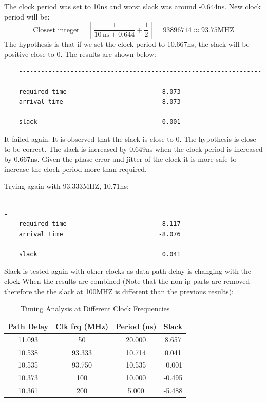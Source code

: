 \documentclass{report}
\begin{document}
The clock period was set to 10ns and worst slack was around -0.644ns. New clock period will be:
\[
\text{Closest integer} = \left\lfloor \frac{1}{10 \, \text{ns} + 0.644} + \frac{1}{2} \right\rfloor = 93896714 \approx 93.75 \text{MHZ}
\]
The hypothesis is that if we set the clock period to 10.667ns, the slack will be positive close to 0. The results are shown below:
\begin{verbatim}
    -------------------------------------------------------------------
    required time                          8.073    
    arrival time                          -8.073    
-------------------------------------------------------------------
    slack                                 -0.001
\end{verbatim}
It failed again. It is observed that the slack is close to 0. The hypothesis is close to be correct. The slack is increased by 0.649ns when the clock period is increased by 0.667ns. Given the phase error and jitter of the clock it is more safe to increase the clock period more than required.

Trying again with 93.333MHZ, 10.71ns:

\begin{verbatim}
    -------------------------------------------------------------------
    required time                          8.117    
    arrival time                          -8.076    
-------------------------------------------------------------------
    slack                                  0.041    
\end{verbatim}
Slack is tested again with other clocks as data path delay is changing with the clock When the results are combined (Note that the non ip parts are removed therefore the the slack at 100MHZ is different than the previous results):

\text{}

\begin{table}[!h]
    \centering
    \caption{Timing Analysis at Different Clock Frequencies}
    \begin{tabular}{|c|c|c|c|}
    \hline
    \textbf{Path Delay} & \textbf{Clk frq (MHz)} & \textbf{Period (ns)} & \textbf{Slack} \\
    \hline
    11.093 & 50       & 20.000   & 8.657     \\
    10.538 & 93.333   & 10.714   & 0.041     \\
    10.535 & 93.750   & 10.535   & -0.001    \\
    10.373 & 100      & 10.000   & -0.495    \\
    10.361 & 200      & 5.000    & -5.488    \\
    \hline
    \end{tabular}
    \end{table}
\end{document}
